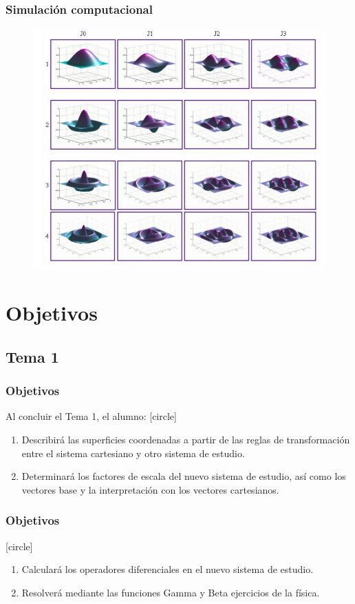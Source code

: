 \begin{frame}
\frametitle{Simulación computacional}
\begin{figure}[h!]
    \centering
    \includegraphics[scale=0.32]{Imagenes/Modos_Normales_Membrana_Circular.png}
\end{figure}
\end{frame}
\section{Objetivos}
\subsection{Tema 1}
\begin{frame}
\frametitle{Objetivos}
Al concluir el Tema 1, el alumno:
[circle]
\begin{enumerate}[<+->]
\item Describirá las superficies coordenadas a partir de las reglas de transformación entre el sistema cartesiano y otro sistema de estudio.
\item Determinará los factores de escala del nuevo sistema de estudio, así como los vectores base y la interpretación con los vectores cartesianos.
\seti
\end{enumerate}
\end{frame}
\begin{frame}
\frametitle{Objetivos}
[circle]
\begin{enumerate}[<+->]
\conti
\item Calculará los operadores diferenciales en el nuevo sistema de estudio.
\item Resolverá mediante las funciones Gamma y Beta ejercicios de la física.
\end{enumerate}
\end{frame}
